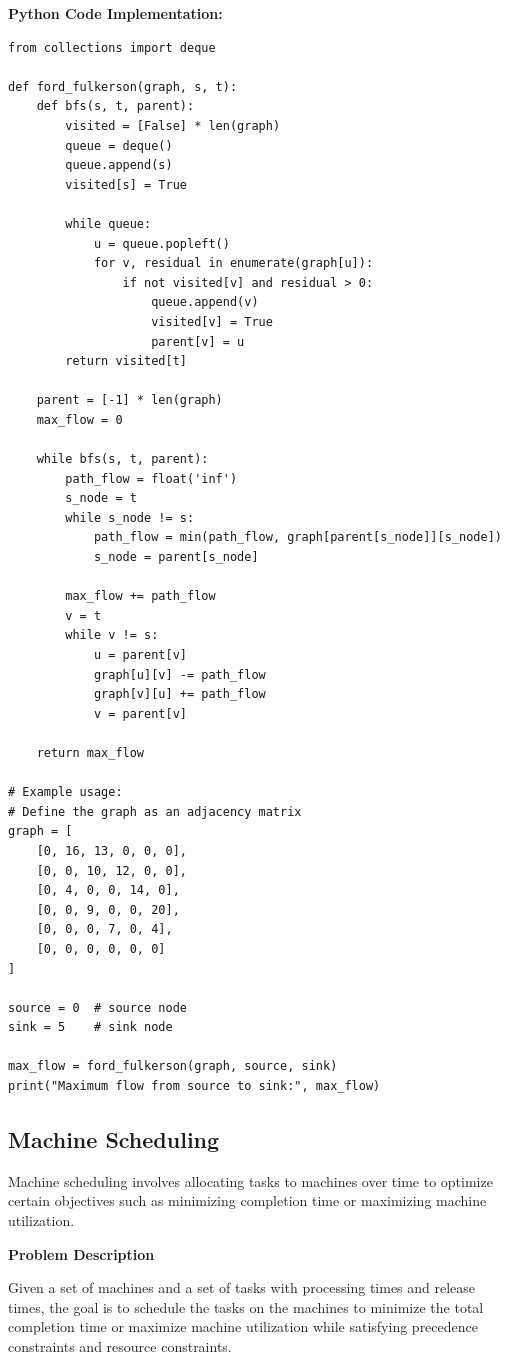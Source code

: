 \documentclass[12pt]{book} %
\begin{document}
\textbf{Python Code Implementation:}
\FloatBarrier
\begin{lstlisting}
from collections import deque

def ford_fulkerson(graph, s, t):
    def bfs(s, t, parent):
        visited = [False] * len(graph)
        queue = deque()
        queue.append(s)
        visited[s] = True
        
        while queue:
            u = queue.popleft()
            for v, residual in enumerate(graph[u]):
                if not visited[v] and residual > 0:
                    queue.append(v)
                    visited[v] = True
                    parent[v] = u
        return visited[t]
    
    parent = [-1] * len(graph)
    max_flow = 0
    
    while bfs(s, t, parent):
        path_flow = float('inf')
        s_node = t
        while s_node != s:
            path_flow = min(path_flow, graph[parent[s_node]][s_node])
            s_node = parent[s_node]
        
        max_flow += path_flow
        v = t
        while v != s:
            u = parent[v]
            graph[u][v] -= path_flow
            graph[v][u] += path_flow
            v = parent[v]
    
    return max_flow

# Example usage:
# Define the graph as an adjacency matrix
graph = [
    [0, 16, 13, 0, 0, 0],
    [0, 0, 10, 12, 0, 0],
    [0, 4, 0, 0, 14, 0],
    [0, 0, 9, 0, 0, 20],
    [0, 0, 0, 7, 0, 4],
    [0, 0, 0, 0, 0, 0]
]

source = 0  # source node
sink = 5    # sink node

max_flow = ford_fulkerson(graph, source, sink)
print("Maximum flow from source to sink:", max_flow)
\end{lstlisting}

\subsection{Machine Scheduling}

Machine scheduling involves allocating tasks to machines over time to optimize certain objectives such as minimizing completion time or maximizing machine utilization.

\textbf{Problem Description}

Given a set of machines and a set of tasks with processing times and release times, the goal is to schedule the tasks on the machines to minimize the total completion time or maximize machine utilization while satisfying precedence constraints and resource constraints.
\end{document}
